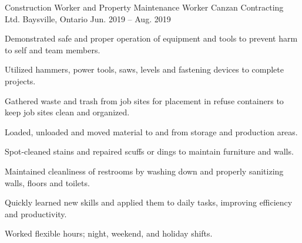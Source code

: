 \begin{cventries}
  \cventry
    {Construction Worker and Property Maintenance Worker} %
    {Canzan Contracting Ltd.} %
    {Baysville, Ontario} %
    {Jun. 2019 -- Aug. 2019} %
    {
      \begin{cvitems} %
        \item {Demonstrated safe and proper operation of equipment and tools to prevent harm to self and team members.}
        \item {Utilized hammers, power tools, saws, levels and fastening devices to complete projects.}
        \item {Gathered waste and trash from job sites for placement in refuse containers to keep job sites clean and organized.}
        \item {Loaded, unloaded and moved material to and from storage and production areas.}
        \item {Spot-cleaned stains and repaired scuffs or dings to maintain furniture and walls.}
        \item {Maintained cleanliness of restrooms by washing down and properly sanitizing walls, floors and toilets.}
        \item {Quickly learned new skills and applied them to daily tasks, improving efficiency and productivity.}
        \item {Worked flexible hours; night, weekend, and holiday shifts.}
      \end{cvitems}
    }
\end{cventries}
